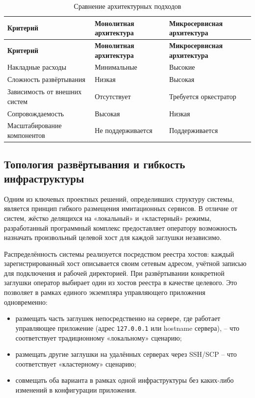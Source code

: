 \begin{xltabular}{\textwidth}{|X|X|X|}
\caption{Сравнение архитектурных подходов} \label{tab:arch-compare} \\
\hline
\textbf{Критерий} & \textbf{Монолитная архитектура} & \textbf{Микросервисная архитектура} \\ \hline
\endfirsthead
\hline
\textbf{Критерий} & \textbf{Монолитная архитектура} & \textbf{Микросервисная архитектура} \\ \hline
\endhead

Накладные расходы & Минимальные & Высокие \\ \hline
Сложность развёртывания & Низкая & Высокая \\ \hline
Зависимость от внешних систем & Отсутствует & Требуется оркестратор \\ \hline
Сопровождаемость & Высокая & Низкая \\ \hline
Масштабирование компонентов & Не поддерживается & Поддерживается \\ \hline
\end{xltabular}

\subsection{Топология развёртывания и гибкость инфраструктуры}

Одним из ключевых проектных решений, определивших структуру системы, является принцип гибкого размещения имитационных сервисов. В отличие от систем, жёстко делящихся на «локальный» и «кластерный» режимы, разработанный программный комплекс предоставляет оператору возможность назначать произвольный целевой хост для каждой заглушки независимо.

Распределённость системы реализуется посредством реестра хостов: каждый зарегистрированный хост описывается своим сетевым адресом, учётной записью для подключения и рабочей директорией. При развёртывании конкретной заглушки оператор выбирает один из хостов реестра в качестве целевого. Это позволяет в рамках единого экземпляра управляющего приложения одновременно:

\begin{itemize}
\item размещать часть заглушек непосредственно на сервере, где работает управляющее приложение (адрес \texttt{127.0.0.1} или hostname сервера), -- что соответствует традиционному «локальному» сценарию;
\item размещать другие заглушки на удалённых серверах через SSH/SCP -- что соответствует «кластерному» сценарию;
\item совмещать оба варианта в рамках одной инфраструктуры без каких-либо изменений в конфигурации приложения.
\end{itemize}

